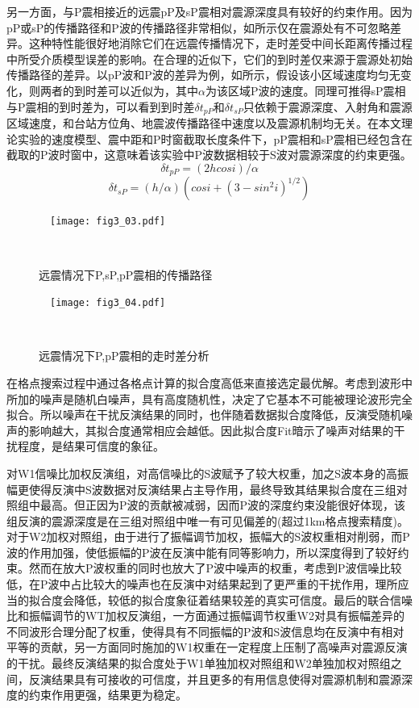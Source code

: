 另一方面，与P震相接近的远震pP及sP震相对震源深度具有较好的约束作用。因为pP或sP的传播路径和P波的传播路径非常相似，如所示仅在震源处有不可忽略差异。这种特性能很好地消除它们在远震传播情况下，走时差受中间长距离传播过程中所受介质模型误差的影响。在合理的近似下，它们的到时差仅来源于震源处初始传播路径的差异\citep{Stein2003}。以pP波和P波的差异为例，如所示，假设该小区域速度均匀无变化，则两者的到时差可以近似为，其中$\alpha$为该区域P波的速度。同理可推得sP震相与P震相的到时差为，可以看到到时差${\delta}t_{pP}$和${\delta}t_{sP}$只依赖于震源深度、入射角和震源区域速度，和台站方位角、地震波传播路径中速度以及震源机制均无关。在本文理论实验的速度模型、震中距和P时窗截取长度条件下，pP震相和sP震相已经包含在截取的P波时窗中，这意味着该实验中P波数据相较于S波对震源深度的约束更强。 
\begin{equation}
\label{eq3_01}
{\delta}t_{pP}=(2hcosi)/\alpha
\end{equation}
\begin{equation}
\label{eq3_02}
{\delta}t_{sP}=(h/\alpha)(cosi+(3-sin^2i)^{1/2})
\end{equation}

\begin{figure}
\centering
  \texttt{[image: fig3\_03.pdf]}
  \caption{远震情况下P,sP,pP震相的传播路径\citep{Stein2003}}
  \label{fig3_03}
\end{figure}
\begin{figure}
\centering
  \texttt{[image: fig3\_04.pdf]}
  \caption{远震情况下P,pP震相的走时差分析\citep{Stein2003}}
  \label{fig3_04}
\end{figure}

在格点搜索过程中通过各格点计算的拟合度高低来直接选定最优解。考虑到波形中所加的噪声是随机白噪声，具有高度随机性，决定了它基本不可能被理论波形完全拟合。所以噪声在干扰反演结果的同时，也伴随着数据拟合度降低，反演受随机噪声的影响越大，其拟合度通常相应会越低。因此拟合度Fit暗示了噪声对结果的干扰程度，是结果可信度的象征。

对W1信噪比加权反演组，对高信噪比的S波赋予了较大权重，加之S波本身的高振幅更使得反演中S波数据对反演结果占主导作用，最终导致其结果拟合度在三组对照组中最高。但正因为P波的贡献被减弱，因而P波的深度约束没能很好体现，该组反演的震源深度是在三组对照组中唯一有可见偏差的(超过1km格点搜索精度)。对于W2加权对照组，由于进行了振幅调节加权，振幅大的S波权重相对削弱，而P波的作用加强，使低振幅的P波在反演中能有同等影响力，所以深度得到了较好约束。然而在放大P波权重的同时也放大了P波中噪声的权重，考虑到P波信噪比较低，在P波中占比较大的噪声也在反演中对结果起到了更严重的干扰作用，理所应当的拟合度会降低，较低的拟合度象征着结果较差的真实可信度。最后的联合信噪比和振幅调节的WT加权反演组，一方面通过振幅调节权重W2对具有振幅差异的不同波形合理分配了权重，使得具有不同振幅的P波和S波信息均在反演中有相对平等的贡献，另一方面同时施加的W1权重在一定程度上压制了高噪声对震源反演的干扰。最终反演结果的拟合度处于W1单独加权对照组和W2单独加权对照组之间，反演结果具有可接收的可信度，并且更多的有用信息使得对震源机制和震源深度的约束作用更强，结果更为稳定。

